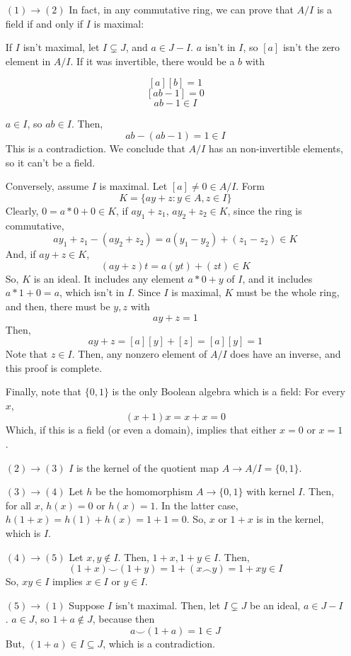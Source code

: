 \documentclass{article}
\begin{document}
      \begin{itemize}[align = left]
      \item[$(1) \rightarrow (2)$]
      In fact, in any commutative ring, we can prove that $A/I$ is a field if
      and only if $I$ is maximal:

      If $I$ isn't maximal, let $I \subsetneq J$, and $a \in J - I$. $a$ isn't
      in $I$, so $[a]$ isn't the zero element in $A/I$. If it was invertible,
      there would be a $b$ with

      \[[a][b] = 1\]
      \[[ab - 1] = 0\]
      \[ab - 1 \in I\]

      $a \in I$, so $ab \in I$. Then, \[ab - (ab - 1) = 1 \in I\] This is a
      contradiction. We conclude that $A/I$ has an non-invertible elements, so
      it can't be a field.

      Conversely, assume $I$ is maximal. Let $[a] \neq 0 \in A/I$. Form \[K =
      \{ay + z: y \in A, z \in I\} \] Clearly, $0 = a*0 + 0 \in K$, if $ay_1 +
      z_1$, $ay_2 + z_2 \in K$, since the ring is commutative, \[ay_1 + z_1
      -(ay_2 + z_2) = a(y_1-y_2) + (z_1 - z_2) \in K\] And, if $ay + z \in K$,
      \[(ay + z)t = a(yt) + (zt) \in K\] So, $K$ is an ideal. It includes any
      element $a*0 + y$ of $I$, and it includes $a*1 + 0 = a$, which isn't in
      $I$. Since $I$ is maximal, $K$ must be the whole ring, and then, there
      must be $y, z$ with \[ay + z = 1\] Then, \[ay + z= [a][y] + [z] = [a][y] =
      1\] Note that $z \in I$. Then, any nonzero element of $A/I$ does have an
      inverse, and this proof is complete.

      Finally, note that $\{0,1\}$ is the only Boolean algebra which is a field:
      For every $x$, \[(x+1)x = x + x = 0\] Which, if this is a field (or even a
      domain), implies that either $x=0$ or $x=1$.

      \item[$(2) \rightarrow (3)$] $I$ is the kernel of the quotient map $A
      \rightarrow A/I = \{0,1\}$.

      \item[$(3) \rightarrow (4)$] Let $h$ be the homomorphism $A \rightarrow
      \{0,1\}$ with kernel $I$. Then, for all $x$, $h(x) = 0$ or $h(x) = 1$. In
      the latter case, $h(1+x) = h(1) + h(x) = 1 + 1 = 0$. So, $x$ or $1+x$ is
      in the kernel, which is $I$.

      \item[$(4) \rightarrow (5)$] Let $x, y \notin I$. Then, $1+x, 1+y \in I$.
      Then, \[(1+x) \smile (1+y) = 1 + (x \frown y) = 1 + xy \in I\] So, $xy \in
      I$ implies $x \in I$ or $y \in I$.

      \item[$(5) \rightarrow (1)$] Suppose $I$ isn't maximal. Then, let $I
      \subsetneq J$ be an ideal, $a \in J - I$. $a \in J$, so $1+a \notin J$,
      because then \[a \smile (1+a) = 1 \in J\] But, $(1+a) \in I \subseteq J$,
      which is a contradiction.

      \end{itemize}
\end{document}
